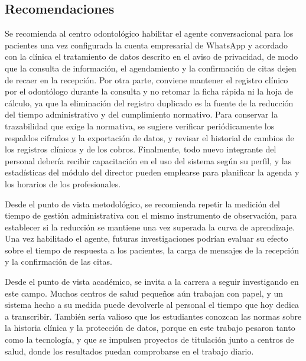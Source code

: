 \subsection{Recomendaciones}

Se recomienda al centro odontológico habilitar el agente conversacional para los pacientes una vez configurada la cuenta empresarial de WhatsApp y acordado con la clínica el tratamiento de datos descrito en el aviso de privacidad, de modo que la consulta de información, el agendamiento y la confirmación de citas dejen de recaer en la recepción. Por otra parte, conviene mantener el registro clínico por el odontólogo durante la consulta y no retomar la ficha rápida ni la hoja de cálculo, ya que la eliminación del registro duplicado es la fuente de la reducción del tiempo administrativo y del cumplimiento normativo. Para conservar la trazabilidad que exige la normativa, se sugiere verificar periódicamente los respaldos cifrados y la exportación de datos, y revisar el historial de cambios de los registros clínicos y de los cobros. Finalmente, todo nuevo integrante del personal debería recibir capacitación en el uso del sistema según su perfil, y las estadísticas del módulo del director pueden emplearse para planificar la agenda y los horarios de los profesionales.

Desde el punto de vista metodológico, se recomienda repetir la medición del tiempo de gestión administrativa con el mismo instrumento de observación, para establecer si la reducción se mantiene una vez superada la curva de aprendizaje. Una vez habilitado el agente, futuras investigaciones podrían evaluar su efecto sobre el tiempo de respuesta a los pacientes, la carga de mensajes de la recepción y la confirmación de las citas.

Desde el punto de vista académico, se invita a la carrera a seguir investigando en este campo. Muchos centros de salud pequeños aún trabajan con papel, y un sistema hecho a su medida puede devolverle al personal el tiempo que hoy dedica a transcribir. También sería valioso que los estudiantes conozcan las normas sobre la historia clínica y la protección de datos, porque en este trabajo pesaron tanto como la tecnología, y que se impulsen proyectos de titulación junto a centros de salud, donde los resultados puedan comprobarse en el trabajo diario.
